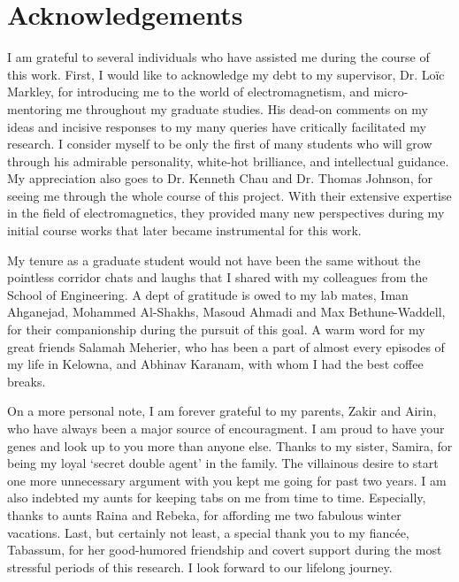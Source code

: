 \chapter{Acknowledgements}    

I am grateful to several individuals who have assisted me during the course of this work. First, I would like to acknowledge my debt to my supervisor, Dr. Lo\"ic Markley, for introducing me to the world of electromagnetism, and micro-mentoring me throughout my graduate studies. His dead-on comments on my ideas and incisive responses to my many queries have critically facilitated my research. I consider myself to be only the first of many students who will grow through his admirable personality, white-hot brilliance, and intellectual guidance. My appreciation also goes to Dr. Kenneth Chau and Dr. Thomas Johnson, for seeing me through the whole course of this project. With their extensive expertise in the field of electromagnetics, they provided many new perspectives during my initial course works that later became instrumental for this work.

My tenure as a graduate student would not have been the same without the pointless corridor chats and laughs that I shared with my colleagues from the School of Engineering. A dept of gratitude is owed to my lab mates, Iman Ahganejad, Mohammed Al-Shakhs, Masoud Ahmadi and Max Bethune-Waddell, for their companionship during the pursuit of this goal. A warm word for my great friends Salamah Meherier, who has been a part of almost every episodes of my life in Kelowna, and Abhinav Karanam, with whom I had the best coffee breaks.
	
On a more personal note, I am forever grateful to my parents, Zakir and Airin, who have always been a major source of encouragment. I am proud to have your genes and look up to you more than anyone else. Thanks to my sister, Samira, for being my loyal `secret double agent' in the family. The villainous desire to start one more unnecessary argument with you kept me going for past two years. I am also indebted my aunts for keeping tabs on me from time to time. Especially, thanks to aunts Raina and Rebeka, for affording me two fabulous winter vacations. Last, but certainly not least, a special thank you to my fianc\'ee, Tabassum, for her good-humored friendship and covert support during the most stressful periods of this research. I look forward to our lifelong journey.